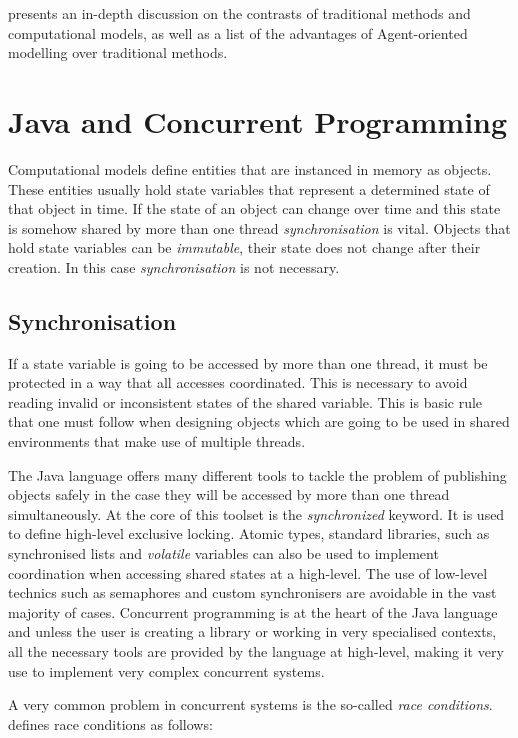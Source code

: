 \citeauthor{miller2007complex} presents an in-depth discussion on the contrasts of traditional methods and computational models, as well as a list of the advantages of Agent-oriented modelling over traditional methods. 

\section{Java and Concurrent Programming}

Computational models define entities that are instanced in memory as objects. These entities usually hold state variables that represent a determined state of that object in time. If the state of an object can change over time and this state is somehow shared by more than one thread \emph{synchronisation} is vital. Objects that hold state variables can be \emph{immutable}, their state does not change after their creation. In this case \emph{synchronisation} is not necessary.

\subsection{Synchronisation}

If a state variable is going to be accessed by more than one thread, it must be protected in a way that all accesses coordinated. This is necessary to avoid reading invalid or inconsistent states of the shared variable. This is basic rule that one must follow when designing objects which are going to be used in shared environments that make use of multiple threads.

The Java language offers many different tools to tackle the problem of publishing objects safely in the case they will be accessed by more than one thread simultaneously. At the core of this toolset is the \emph{synchronized} keyword. It is used to define high-level exclusive locking. Atomic types, standard libraries, such as synchronised lists and \emph{volatile} variables can also be used to implement coordination when accessing shared states at a high-level. The use of low-level technics such as semaphores and custom synchronisers are avoidable in the vast majority of cases. Concurrent programming is at the heart of the Java language and unless the user is creating a library or working in very specialised contexts, all the necessary tools are provided by the language at high-level, making it very use to implement very complex concurrent systems.

A very common problem in concurrent systems is the so-called \emph{race conditions}. \citeauthor{goetz2006java} defines race conditions as follows:

